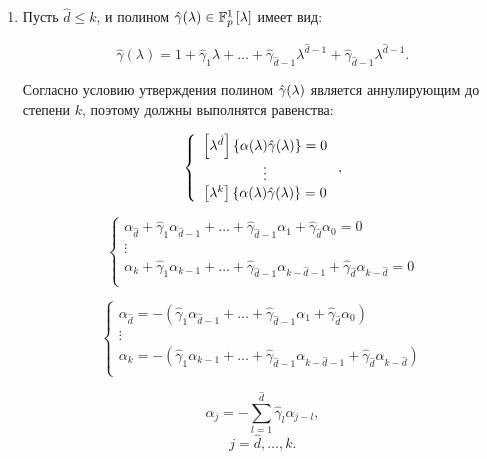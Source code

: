 \begin{statement}
\begin{enumerate}
\begin{enumerate}
				\item
					Пусть $\hat d \le k$, и полином $\hat\gamma (\lambda) \in \mathbb{F}_p^1 \left [ \lambda \right ]$ имеет вид:

						$$ \hat\gamma(\lambda)
							= 1 + \hat\gamma_1 \lambda + \dots + \hat\gamma_{\hat d - 1} \lambda^{\hat d - 1} + \hat\gamma_{\hat d - 1} \lambda^{\hat d - 1}. $$

					Согласно условию утверждения полином $\hat\gamma (\lambda)$ является аннулирующим до степени $k$, поэтому должны
					выполнятся равенства:

						$$
							\left \{
							\begin{array}{c}
								\left [ \lambda^{\hat d} \right ] \left \{ \alpha (\lambda) \hat\gamma (\lambda) \right \} = 0 \\
								\vdots \\
								\left [ \lambda^{k} \right ] \left \{ \alpha (\lambda) \hat\gamma (\lambda) \right \} = 0 \\
							\end{array}
							\right .
							,
						$$

						$$
							\left \{
							\begin{array}{c}
								\alpha_{\hat d} + \hat\gamma_1 \alpha_{\hat d - 1} + \dots + \hat\gamma_{\hat d - 1} \alpha_1 + \hat\gamma_{\hat d} \alpha_0 = 0 \\
								\vdots \\
								\alpha_k + \hat\gamma_1 \alpha_{k-1} + \dots + \hat\gamma_{\hat d - 1} \alpha_{k - \hat d - 1} + \hat\gamma_{\hat d} \alpha_{k - \hat d} = 0 \\
							\end{array}
							\right .
						$$

						$$
							\left \{
							\begin{array}{c}
								\alpha_{\hat d} = - \left ( \hat\gamma_1 \alpha_{\hat d - 1} + \dots + \hat\gamma_{\hat d - 1} \alpha_1 + \hat\gamma_{\hat d} \alpha_0 \right ) \\
								\vdots \\
								\alpha_k = - \left ( \hat\gamma_1 \alpha_{k-1} + \dots + \hat\gamma_{\hat d - 1} \alpha_{k - \hat d - 1} + \hat\gamma_{\hat d} \alpha_{k - \hat d} \right ) \\
							\end{array}
							\right .
						$$

						\begin{equation} \label{equation:MDAP:alpha_through_hat_gamma}
							\alpha_j = - \sum_{l=1}^{\hat d} \hat\gamma_l \alpha_{j-l},
						\end{equation}
						$$ j = \hat d, \dots, k. $$


\end{enumerate}
\end{enumerate}
\end{statement}
